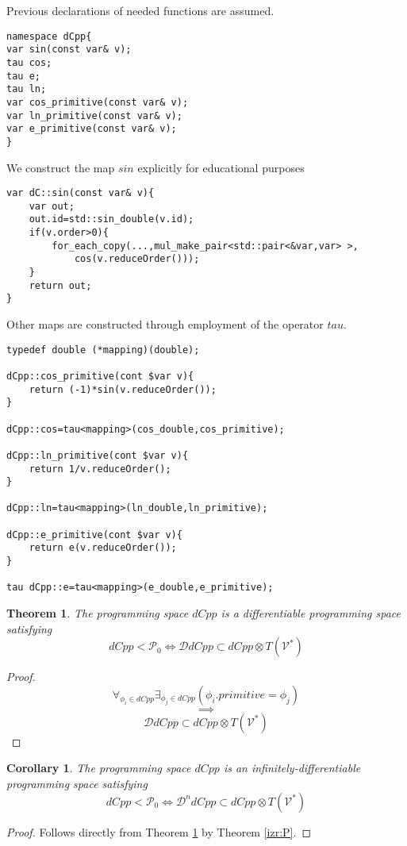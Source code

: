 \documentclass{article}
\newcommand{\VV}{\mathcal{V}}
\newcommand{\dP}{\mathcal{P}}
\newcommand{\DD}{\mathcal{D}}
\newtheorem{izrek}{Theorem}[section]
\newtheorem{corollary}{Corollary}[section]
\begin{document}
Previous declarations of needed functions are assumed. 

\begin{lstlisting}
namespace dCpp{
var sin(const var& v);
tau cos;
tau e;
tau ln;
var cos_primitive(const var& v);
var ln_primitive(const var& v);
var e_primitive(const var& v);
}
\end{lstlisting}

We construct the map $sin$ explicitly for educational purposes

\begin{lstlisting}
var dC::sin(const var& v){
    var out;
    out.id=std::sin_double(v.id);
    if(v.order>0){
    	for_each_copy(...,mul_make_pair<std::pair<&var,var> >,
    		cos(v.reduceOrder()));
    }
    return out;
}
\end{lstlisting}

Other maps are constructed through employment of the operator $tau$.

\begin{lstlisting}
typedef double (*mapping)(double);

dCpp::cos_primitive(cont $var v){
	return (-1)*sin(v.reduceOrder());
}

dCpp::cos=tau<mapping>(cos_double,cos_primitive);

dCpp::ln_primitive(cont $var v){
	return 1/v.reduceOrder();
}

dCpp::ln=tau<mapping>(ln_double,ln_primitive);

dCpp::e_primitive(cont $var v){
	return e(v.reduceOrder());
}

tau dCpp::e=tau<mapping>(e_double,e_primitive);

\end{lstlisting}

\begin{izrek}\label{izr:dCpp}
The programming space $dCpp$ is a differentiable programming space satisfying
\begin{equation}
dCpp<\dP_0\iff \DD dCpp\subset dCpp\otimes T(\VV^*)
\end{equation}
\end{izrek}
\begin{proof}
\begin{equation}
\forall_{\phi_i\in dCpp}\exists_{\phi_j\in dCpp}(\phi_i.primitive=\phi_j)
\end{equation}
$$\implies$$
\begin{equation}
\DD dCpp\subset dCpp\otimes T(\VV^*)
\end{equation}
\end{proof}
\begin{corollary}
The programming space $dCpp$ is an infinitely-differentiable programming space satisfying
\begin{equation}
dCpp<\dP_0\iff \DD^n dCpp\subset dCpp\otimes T(\VV^*)
\end{equation}
\end{corollary}
\begin{proof}
Follows directly from Theorem \ref{izr:dCpp} by Theorem \ref{izr:P}.
\end{proof}
\end{document}
